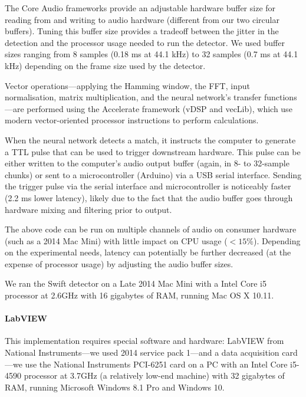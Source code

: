 \documentclass[10pt,letterpaper]{article}
\renewcommand{\subsubsection}[1]{\paragraph{#1}}
\begin{document}
The Core Audio frameworks provide an adjustable hardware buffer size
for reading from and writing to audio hardware (different from our two
circular buffers). Tuning this buffer size provides a tradeoff between
the jitter in the detection and the processor usage needed to run the
detector. We used buffer sizes ranging from 8 samples (0.18 ms at 44.1
kHz) to 32 samples (0.7 ms at 44.1 kHz) depending on the frame size 
used by the detector.

Vector operations---applying the Hamming window, the FFT, input
normalisation, matrix multiplication, and the neural network's
transfer functions---are performed using the Accelerate framework
(vDSP and vecLib), which use modern vector-oriented processor
instructions to perform calculations.

When the neural network detects a match, it instructs the computer to
generate a TTL pulse that can be used to trigger downstream hardware.
This pulse can be either written to the computer's audio output buffer
(again, in 8- to 32-sample chunks) or sent to a microcontroller
(Arduino) via a USB serial interface. Sending the trigger pulse via
the serial interface and microcontroller is noticeably faster (2.2 ms
lower latency), likely due to the fact that the audio buffer goes
through hardware mixing and filtering prior to output.

The above code can be run on multiple channels of audio on consumer
hardware (such as a 2014 Mac Mini) with little impact on CPU usage
($<15\%$). Depending on the experimental needs, latency can potentially
be further decreased (at the expense of processor usage) by adjusting the audio
buffer sizes.

We ran the Swift detector on a Late 2014 Mac Mini with a Intel Core i5
processor at 2.6GHz  with 16 gigabytes of RAM, running Mac OS X 10.11.

\subsubsection{LabVIEW}

This implementation requires special software and hardware: LabVIEW
from National Instruments---we used 2014 service pack 1---and a data acquisition card---we use the
National Instruments PCI-6251 card on a PC with an Intel Core i5-4590
processor at 3.7GHz (a relatively low-end machine) with 32 gigabytes
of RAM, running Microsoft Windows 8.1 Pro and Windows 10.
\end{document}
